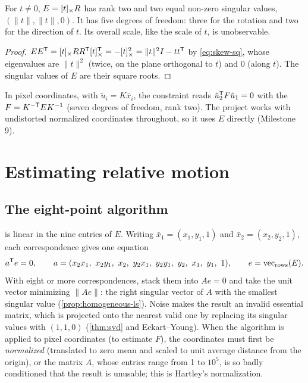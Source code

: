 \begin{proposition}
\label{prop:essential}
For $t \ne 0$, $E = [t]_{\times}R$ has rank two and two equal non-zero singular values, $(\|t\|, \|t\|, 0)$. It has five degrees of freedom: three for the rotation and two for the
direction of $t$. Its overall scale, like the scale of $t$, is unobservable.
\end{proposition}
\begin{proof}
$EE^{\mathsf{T}} = [t]_{\times}RR^{\mathsf{T}}[t]_{\times}^{\mathsf{T}} = -[t]_{\times}^2 = \|t\|^2I - tt^{\mathsf{T}}$ by \eqref{eq:skew-sq}, whose eigenvalues are $\|t\|^2$ (twice, on the plane orthogonal to $t$) and $0$ (along $t$). The
singular values of $E$ are their square roots.
\end{proof}

In pixel coordinates, with $\tilde u_i = K\bar x_i$, the constraint reads $\tilde u_2^{\mathsf{T}} F\tilde u_1 = 0$ with the  $F = K^{-\mathsf{T}} EK^{-1}$ (seven degrees of freedom,
rank two). The project works with undistorted normalized coordinates throughout, so it uses $E$ directly (Milestone 9).

\section{Estimating relative motion}

\subsection{The eight-point algorithm}

 is linear in the nine entries of $E$. Writing $\bar x_1 = (x_1, y_1, 1)$ and $\bar x_2 = (x_2, y_2, 1)$, each correspondence gives one equation
\begin{equation}
  a\T e = 0, \qquad a = (x_2x_1,\ x_2y_1,\ x_2,\ y_2x_1,\ y_2y_1,\ y_2,\ x_1,\ y_1,\ 1), \qquad e = \vect_{\text{rows}}(E).
\end{equation}
With eight or more correspondences, stack them into $Ae = 0$ and take the unit vector minimizing $\|Ae\|$: the right singular vector of $A$ with the smallest
singular value (\cref{prop:homogeneous-ls}). Noise makes the result an invalid essential matrix, which is projected onto the nearest valid one by replacing its
singular values with $(1, 1, 0)$ (\cref{thm:svd} and Eckart--Young). When the algorithm is applied to pixel coordinates (to estimate $F$), the coordinates must first
be \emph{normalized} (translated to zero mean and scaled to unit average distance from the origin), or the matrix $A$, whose entries range from 1 to $10^5$, is so
badly conditioned that the result is unusable; this is Hartley's normalization.

